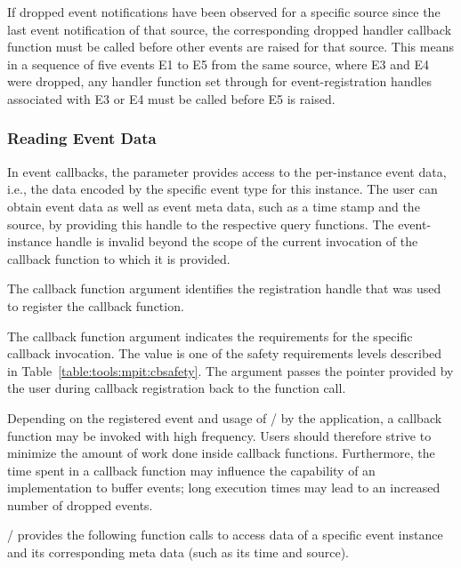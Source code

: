 If dropped event notifications have been observed for a specific source since the last
event notification of that source, the corresponding dropped handler
callback function must be called before other events are raised for
that source. This means in a sequence of five events E1 to E5 from the same
source, where E3 and E4 were dropped, any handler function set through
 for event-registration
handles associated with E3 or E4 must be called before E5 is raised.


\subsubsection{Reading Event Data}

In event callbacks, the parameter  provides
access to the per-instance event data, i.e., the data encoded by the
specific event type for this instance.  The user can obtain event data as
well as event meta data, such as a time stamp and the source, by providing
this handle to the respective query functions. The event-instance handle is
invalid beyond the scope of the current invocation of the callback function
to which it is provided.

The callback function argument  
identifies the registration handle that was used to register the callback function.

The callback function  argument  indicates the requirements for the
specific callback invocation. The value is one of the safety requirements levels
described in Table~\ref{table:tools:mpit:cbsafety}.
The argument  passes the pointer provided by the
user during callback registration back to the function call.

\begin{users}
Depending on the registered event and usage of \MPI/ by the application, a
callback function may be invoked with high frequency. Users should
therefore strive to minimize the amount of work done inside callback
functions. Furthermore, the time spent in a callback function may influence
the capability of an implementation to buffer events; long execution
times may lead to an increased number of dropped events.
\end{users}

\MPI/ provides the following function calls to access data of a specific event
instance and its corresponding meta data (such as its time and source).

